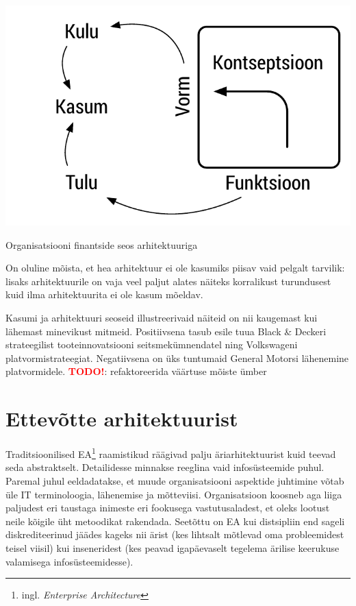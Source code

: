 \documentclass{tufte-book}
\newcommand{\TODO}{\textcolor{red}{\bf TODO!}\xspace}
\begin{document}
\begin{marginfigure}
	\begin{center}
		\includegraphics[width=\linewidth]{ffc_profit.pdf}
		\caption{Organisatsiooni finantside seos arhitektuuriga}
		\label{fig:arh}
	\end{center}
\end{marginfigure}


On oluline mõista, et hea arhitektuur ei ole kasumiks piisav vaid pelgalt tarvilik: lisaks arhitektuurile on vaja veel paljut alates näiteks korralikust turundusest kuid ilma arhitektuurita ei ole kasum mõeldav. 

Kasumi ja arhitektuuri seoseid illustreerivaid näiteid on nii kaugemast kui lähemast minevikust mitmeid. Positiivsena tasub esile tuua Black \& Deckeri strateegilist tooteinnovatsiooni seitsmekümnendatel ning Volkswageni platvormistrateegiat. Negatiivsena on üks tuntumaid General Motorsi lähenemine platvormidele. 
\TODO: refaktoreerida väärtuse mõiste ümber


\section{Ettevõtte arhitektuurist}
Traditsioonilised EA\footnote{ingl. \emph{Enterprise Architecture}} raamistikud räägivad palju äriarhitektuurist kuid teevad seda abstraktselt. Detailidesse minnakse reeglina vaid infosüsteemide puhul. Paremal juhul eeldadatakse, et muude organisatsiooni aspektide juhtimine võtab üle IT terminoloogia, lähenemise ja mõtteviisi. Organisatsioon koosneb aga liiga paljudest eri taustaga inimeste eri fookusega vastutusaladest, et oleks lootust neile kõigile üht metoodikat rakendada.  Seetõttu on EA kui distsipliin end sageli diskrediteerinud jäädes kageks nii ärist (kes lihtsalt mõtlevad oma probleemidest teisel viisil) kui inseneridest (kes peavad igapäevaselt tegelema ärilise keerukuse valamisega infosüsteemidesse).
\end{document}
